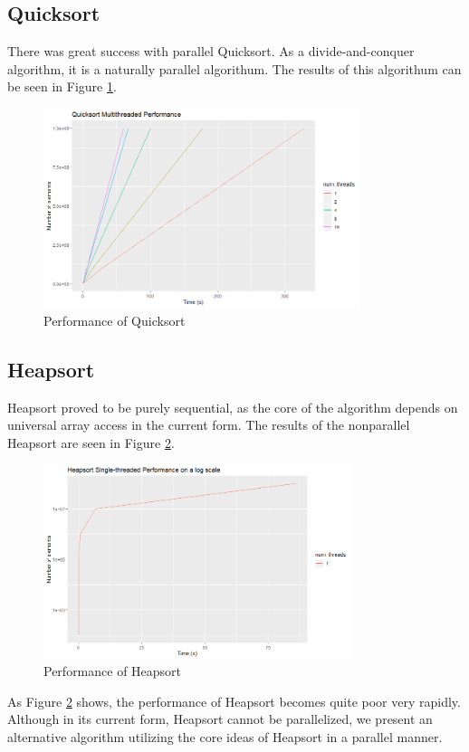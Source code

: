 \documentclass[conference]{IEEEtran}
\begin{document}
    \subsection{Quicksort}
    There was great success with parallel Quicksort. 
    As a divide-and-conquer algorithm, it is a naturally parallel algorithum. 
    The results of this algorithum can be seen in Figure \ref{qck_per}. 
    \begin{figure}[h]
        \includegraphics[width=9.25cm]{qs_mt.png} 
        \caption{Performance of Quicksort}
        \label{qck_per}
    \end{figure}
    
    
    \subsection{Heapsort}
    Heapsort proved to be purely sequential, as the core of the algorithm depends on universal array access in the current form. 
    The results of the nonparallel Heapsort are seen in Figure \ref{hs_per}. 
    \begin{figure}[h]
        \includegraphics[width=9cm]{hs_per.png} 
        \caption{Performance of Heapsort}
        \label{hs_per}
    \end{figure}
    As Figure \ref{hs_per} shows, the performance of Heapsort becomes quite poor very rapidly. 
    Although in its current form, Heapsort cannot be parallelized, we present an alternative algorithm utilizing the core ideas of Heapsort in a parallel manner. 
    
\end{document}

